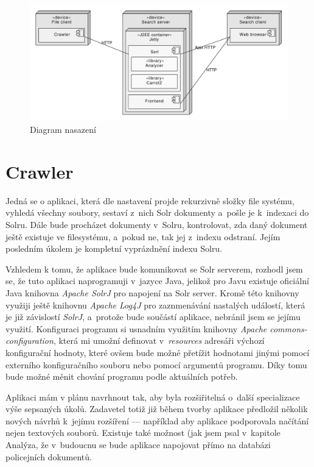 \begin{figure}[h]
\begin{center}
\includegraphics[width=13cm]{Architecture}
\caption{Diagram nasazení}
\label{fig:Architecture}
\end{center}
\end{figure}

\section{Crawler} \label{design_crawler}
Jedná se o aplikaci, která dle nastavení projde rekurzivně složky file systému, vyhledá všechny soubory, sestaví z~nich Solr dokumenty a~pošle je k~indexaci do Solru. Dále bude procházet dokumenty v~Solru, kontrolovat, zda daný dokument ještě existuje ve filesystému, a~pokud ne, tak jej z~indexu odstraní. Jejím posledním úkolem je kompletní vyprázdnění indexu Solru.

Vzhledem k tomu, že aplikace bude komunikovat se Solr serverem, rozhodl jsem se, že tuto aplikaci naprogramuji v~jazyce Java, jelikož pro Javu existuje oficiální Java knihovna \emph{Apache SolrJ} pro napojení na Solr server. Kromě této knihovny využiji ještě knihovnu \emph{Apache Log4J} pro zaznmenávání nastalých událostí, která je již závislostí \emph{SolrJ}, a~protože bude součástí aplikace, nebránil jsem se jejímu využití. Konfiguraci programu si usnadním využitím knihovny \emph{Apache commons-configuration}, která mi umožní definovat v~\emph{resources} adresáři výchozí konfigurační hodnoty, které ovšem bude možné přetížit hodnotami jinými pomocí externího konfiguračního souboru nebo pomocí argumentů programu. Díky tomu bude možné měnit chování programu podle aktuálních potřeb.

Aplikaci mám v plánu navrhnout tak, aby byla rozšiřitelná o~další specializace výše sepsaných úkolů. Zadavetel totiž již během tvorby aplikace předložil několik nových návrhů k~jejímu rozšíření — například aby aplikace podporovala načítání nejen textových souborů. Existuje také možnost (jak jsem psal v~kapitole Analýza, že v~budoucnu se bude aplikace napojovat přímo na databázi policejních dokumentů.

